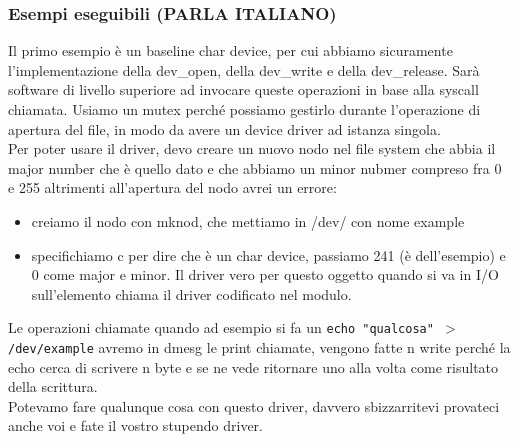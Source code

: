 \documentclass[12pt, oneside]{extbook}
\begin{document}
\subsubsection{Esempi eseguibili (PARLA ITALIANO)}
Il primo esempio è un baseline char device, per cui abbiamo sicuramente l'implementazione della dev\_open, della dev\_write e della dev\_release. Sarà software di livello superiore ad invocare queste operazioni in base alla syscall chiamata. Usiamo un mutex perché possiamo gestirlo durante l'operazione di apertura del file, in modo da avere un device driver ad istanza singola.\\Per poter usare il driver, devo creare un nuovo nodo nel file system che abbia il major number che è quello dato e che abbiamo un minor nubmer compreso fra 0 e 255 altrimenti all'apertura del nodo avrei un errore:
\begin{itemize}
\item creiamo il nodo con mknod, che mettiamo in /dev/ con nome example
\item specifichiamo c per dire che è un char device, passiamo 241 (è dell'esempio) e 0 come major e minor. Il driver vero per questo oggetto quando si va in I/O sull'elemento chiama il driver codificato nel modulo.
\end{itemize}
Le operazioni chiamate quando ad esempio si fa un \texttt{echo "qualcosa" $>$ /dev/example} avremo in dmesg le print chiamate, vengono fatte n write perché la echo cerca di scrivere n byte e se ne vede ritornare uno alla volta come risultato della scrittura.\\Potevamo fare qualunque cosa con questo driver, davvero sbizzarritevi provateci anche voi e fate il vostro stupendo driver.
\end{document}
